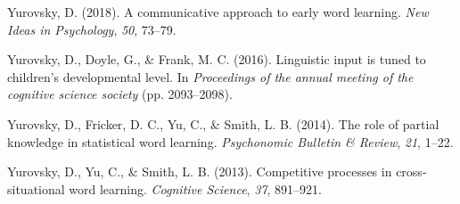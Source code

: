 \documentclass[english,,man,floatsintext]{apa6}
\begin{document}
\leavevmode\hypertarget{ref-yurovsky2018}{}%
Yurovsky, D. (2018). A communicative approach to early word learning. \emph{New Ideas in Psychology}, \emph{50}, 73--79.

\leavevmode\hypertarget{ref-yurovsky2016}{}%
Yurovsky, D., Doyle, G., \& Frank, M. C. (2016). Linguistic input is tuned to children's developmental level. In \emph{Proceedings of the annual meeting of the cognitive science society} (pp. 2093--2098).

\leavevmode\hypertarget{ref-yurovsky2014}{}%
Yurovsky, D., Fricker, D. C., Yu, C., \& Smith, L. B. (2014). The role of partial knowledge in statistical word learning. \emph{Psychonomic Bulletin \& Review}, \emph{21}, 1--22.

\leavevmode\hypertarget{ref-yurovsky2013}{}%
Yurovsky, D., Yu, C., \& Smith, L. B. (2013). Competitive processes in cross-situational word learning. \emph{Cognitive Science}, \emph{37}, 891--921.
\end{document}
